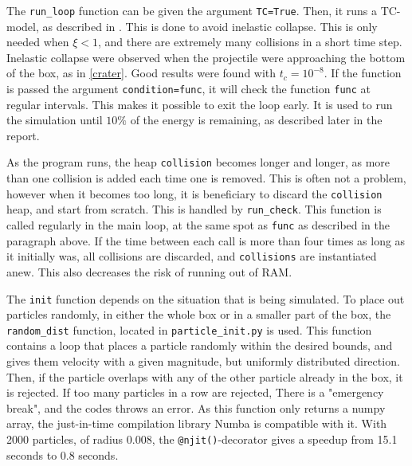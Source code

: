 \documentclass{article}
\begin{document}
    The \verb|run_loop| function can be given the argument \verb|TC=True|.
    Then, it runs a TC-model, as described in \cite{TC}.
    This is done to avoid inelastic collapse.
    This is only needed when $\xi<1$, and there are extremely many collisions in a short time step.
    Inelastic collapse were observed when the projectile were approaching the bottom of the box, as in \autoref{crater}.
    Good results were found with $t_c = 10^{-8}$.
    If the function is passed the argument \verb|condition=func|, it will check the function \verb|func| at regular intervals.
    This makes it possible to exit the loop early.
    It is used to run the simulation until $10\%$ of the energy is remaining, as described later in the report.

    As the program runs, the heap \verb|collision| becomes longer and longer, as more than one collision is added each time one is removed.
    This is often not a problem, however when it becomes too long, it is beneficiary to discard the \verb|collision| heap, and start from scratch.
    This is handled by \verb|run_check|.
    This function is called regularly in the main loop, at the same spot as \verb|func| as described in the paragraph above.
    If the time between each call is more than four times as long as it initially was, all collisions are discarded, and \verb|collisions| are instantiated anew.
    This also decreases the risk of running out of RAM.

    The \verb|init| function depends on the situation that is being simulated.
    To place out particles randomly, in either the whole box or in a smaller part of the box, the \verb|random_dist| function, located in \verb|particle_init.py| is used.
    This function contains a loop that places a particle randomly within the desired bounds, and gives them velocity with a given magnitude, but uniformly distributed direction.
    Then, if the particle overlaps with any of the other particle already in the box, it is rejected.
    If too many particles in a row are rejected, There is a "emergency break", and the codes throws an error.
    As this function only returns a numpy array, the just-in-time compilation library Numba is compatible with it.
    With 2000 particles, of radius 0.008, the \verb|@njit()|-decorator gives a speedup from 15.1 seconds to 0.8 seconds.
\end{document}
